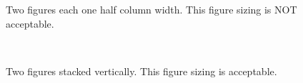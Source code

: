 \documentclass[pageno]{jpaper}
\begin{document}
\begin{figure}[t]%
    \centering

    \caption{Two figures each one half column width. This figure sizing is NOT acceptable.}%
    \label{fig:twosidebyside-no}%

\end{figure}

\begin{figure}[t]%
    \centering
     \\

    \caption{Two figures stacked vertically. This figure sizing is acceptable.}%
    \label{fig:twostacked}%

\end{figure}
\end{document}
